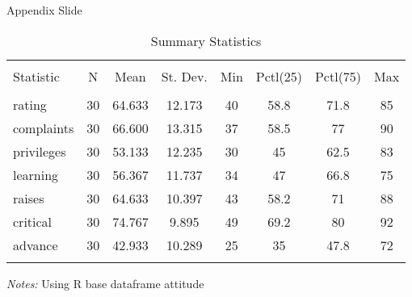 \documentclass{beamer}
\begin{document}
\begin{frame}{Appendix Slide}\label{appendix1}

    {\fontsize{9}{10}\selectfont
    
        \begin{table}[!htbp] \centering 
        \caption{Summary Statistics}
        \label{appendix_summ_stat}
            \begin{tabular}{@{\extracolsep{5pt}}lccccccc} 
            \hline 
            \hline \\[-1.8ex] 
            Statistic & \multicolumn{1}{c}{N} & \multicolumn{1}{c}{Mean} & \multicolumn{1}{c}{St. Dev.} & \multicolumn{1}{c}{Min} & \multicolumn{1}{c}{Pctl(25)} & \multicolumn{1}{c}{Pctl(75)} & \multicolumn{1}{c}{Max} \\ 
            \hline \\[-1.8ex] 
            rating & 30 & 64.633 & 12.173 & 40 & 58.8 & 71.8 & 85 \\ 
            complaints & 30 & 66.600 & 13.315 & 37 & 58.5 & 77 & 90 \\ 
            privileges & 30 & 53.133 & 12.235 & 30 & 45 & 62.5 & 83 \\ 
            learning & 30 & 56.367 & 11.737 & 34 & 47 & 66.8 & 75 \\ 
            raises & 30 & 64.633 & 10.397 & 43 & 58.2 & 71 & 88 \\ 
            critical & 30 & 74.767 & 9.895 & 49 & 69.2 & 80 & 92 \\ 
            advance & 30 & 42.933 & 10.289 & 25 & 35 & 47.8 & 72 \\ 
            \hline \\[-1.8ex] 
            \end{tabular} 
            
            \textit{Notes:} Using R base dataframe attitude \\ 
        \end{table} 
        
    }
    
    \hyperlink{main1}{}
\end{frame}
\end{document}
